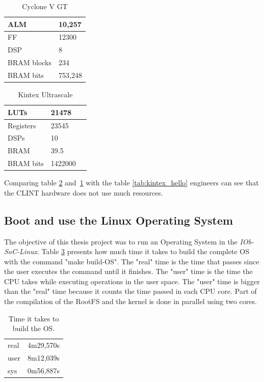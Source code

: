 \begin{table}[!ht]
    \centering
    \begin{tabular}{|l|l|}
        \hline
        ALM         & 10,257  \\ \hline
        FF          & 12300   \\ \hline
        DSP         & 8       \\ \hline
        BRAM blocks & 234     \\ \hline
        BRAM bits   & 753,248 \\ \hline
    \end{tabular}
    \caption{Cyclone V GT}
    \label{tab:cyclone_int}
\end{table}
\begin{table}[!ht]
    \centering
    \begin{tabular}{|l|l|l|}
        \hline
        LUTs      & 21478   \\ \hline
        Registers & 23545   \\ \hline
        DSPs      & 10      \\ \hline
        BRAM      & 39.5    \\ \hline
        BRAM bits & 1422000 \\ \hline
    \end{tabular}
    \caption{Kintex Ultrascale}
    \label{tab:kintex_int}
\end{table}

Comparing table \ref{tab:kintex_int} and~\ref{tab:cyclone_int} with the table \ref{tab:kintex_hello} engineers can see that the CLINT hardware does not use much resources.

\subsection{Boot and use the Linux Operating System}

The objective of this thesis project was to run an Operating System in the \textit{IOb-SoC-Linux}. Table \ref{tab:time_os} presents how much time it takes to build the complete OS with the command "make build-OS". The "real" time is the time that passes since the user executes the command until it finishes. The "user" time is the time the CPU takes while executing operations in the user space. The "user" time is bigger than the "real" time because it counts the time passed in each CPU core. Part of the compilation of the RootFS and the kernel is done in parallel using two cores.

\begin{table}[!ht]
    \centering
    \begin{tabular}{ll}
    real & 4m29,570s \\
    user & 8m12,039s \\
    sys  & 0m56,887s
    \end{tabular}
    \caption{Time it takes to build the OS.}
    \label{tab:time_os}
\end{table}

